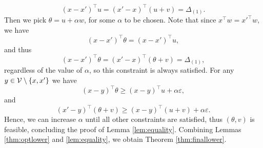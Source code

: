 \begin{equation}
    (x-x')^\top u = (x'-x)^\top (u +v)= \Delta_{(1)}.
\end{equation}
Then we pick $\theta = u + \alpha w$, for some $\alpha$ to be chosen. Note that since $x^\top w = x'^\top w$, we have \begin{equation}
    (x-x')^\top\theta = (x-x')^\top u,
\end{equation}and thus \begin{equation}
    (x-x')^\top \theta = (x'-x)^\top (\theta +v)= \Delta_{(1)},
\end{equation}
regardless of the value of $\alpha$, so this constraint is always satisfied. For any $y \in \mathcal{V}\setminus \{x,x'\}$ we have 
\begin{equation}
    (x-y)^\top\theta \geq (x-y)^\top u + \alpha\varepsilon,
\end{equation}
and \begin{equation}
    (x'-y)^\top(\theta + v) \geq (x-y)^\top (u + v) + \alpha\varepsilon.
\end{equation}
Hence, we can increase $\alpha$ until all other constraints are satisfied, thus $(\theta,v)$ is feasible, concluding the proof of Lemma \ref{lem:equality}. Combining Lemmas \ref{thm:optlower} and \ref{lem:equality}, we obtain Theorem \ref{thm:finallower}.
